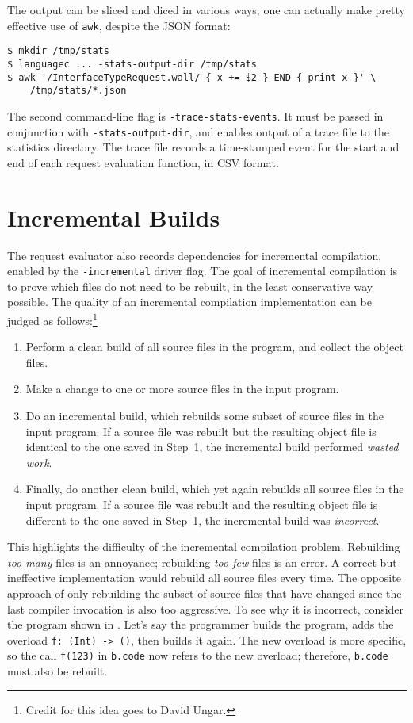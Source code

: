 \documentclass[../generics]{subfiles}
\begin{document}
The output can be sliced and diced in various ways; one can actually make pretty effective use of \texttt{awk}, despite the JSON format:
\begin{Verbatim}
$ mkdir /tmp/stats
$ languagec ... -stats-output-dir /tmp/stats
$ awk '/InterfaceTypeRequest.wall/ { x += $2 } END { print x }' \
    /tmp/stats/*.json
\end{Verbatim}
The second command-line flag is \texttt{-trace-stats-events}. It must be passed in conjunction with \texttt{-stats-output-dir}, and enables output of a trace file to the statistics directory. The trace file records a time-stamped event for the start and end of each request evaluation function, in CSV format.
\IndexFlag{stats-output-dir}

\section{Incremental Builds}\label{incremental builds}
The request evaluator also records dependencies for incremental compilation, enabled by the \verb|-incremental| driver flag. The goal of incremental compilation is to prove which files do not need to be rebuilt, in the least conservative way possible. The quality of an incremental compilation implementation can be judged as follows:\footnote{Credit for this idea goes to David Ungar.}
\begin{enumerate}
\item Perform a clean build of all source files in the program, and collect the object files.
\item Make a change to one or more source files in the input program.
\item Do an incremental build, which rebuilds some subset of source files in the input program. If a source file was rebuilt but the resulting object file is identical to the one saved in Step~1, the incremental build performed \emph{wasted work}.
\item Finally, do another clean build, which yet again rebuilds all source files in the input program. If a source file was rebuilt and the resulting object file is different to the one saved in Step~1, the incremental build was \emph{incorrect}.
\end{enumerate}
This highlights the difficulty of the incremental compilation problem. Rebuilding \emph{too many} files is an annoyance; rebuilding \emph{too few} files is an error. A correct but ineffective implementation would rebuild all source files every time. The opposite approach of only rebuilding the subset of source files that have changed since the last compiler invocation is also too aggressive. To see why it is incorrect, consider the program shown in . Let's say the programmer builds the program, adds the overload \verb|f: (Int) -> ()|, then builds it again. The new overload is more specific, so the call \texttt{f(123)} in \texttt{b.code} now refers to the new overload; therefore, \texttt{b.code} must also be rebuilt.
\end{document}
